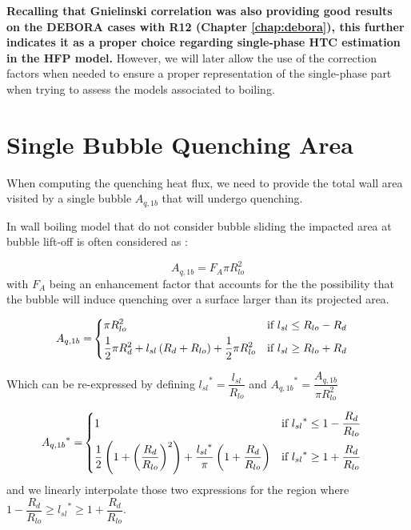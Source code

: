 \textbf{Recalling that Gnielinski correlation was also providing good results on the DEBORA cases with R12 (Chapter \ref{chap:debora}), this further indicates it as a proper choice regarding single-phase HTC estimation in the HFP model.} However, we will later allow the use of the correction factors when needed to ensure a proper representation of the single-phase part when trying to assess the models associated to boiling.




\section{Single Bubble Quenching Area}

When computing the quenching heat flux, we need to provide the total wall area visited by a single bubble $A_{q,1b}$ that will undergo quenching.

In wall boiling model that do not consider bubble sliding \cite{kurul_podowski, ncfd_hfp, shaver_podowski} the impacted area at bubble lift-off is often considered as :

\begin{equation}
A_{q,1b} = F_{A} \pi R_{lo}^{2}
\end{equation} 
with $F_{A}$ being an enhancement factor that accounts for the the possibility that the bubble will induce quenching over a surface larger than its projected area.



\begin{align}
A_{q,1b} = &
\begin{dcases}
\pi R_{lo}^{2} & \text{if } l_{sl}\leq R_{lo}-R_{d} \\
%
\frac{1}{2}\pi R_{d}^{2} + l_{sl}\parth{R_{d}+R_{lo}} + \frac{1}{2}\pi R_{lo}^{2} & \text{if } l_{sl} \geq R_{lo}+R_{d}
%
\end{dcases}
\end{align}

Which can be re-expressed by defining ${l_{sl}}^{*}=\dfrac{l_{sl}}{R_{lo}}$ and ${A_{q,1b}}^{*}=\dfrac{A_{q,1b}}{\pi R_{lo}^{2}}$

\begin{align}
{A_{q,1b}}^{*} = &
\begin{dcases}
1 & \text{if } {l_{sl}}^{*}\leq 1- \frac{R_{d}}{R_{lo}} \\
%
\frac{1}{2}\parth{1+\parth{\frac{R_{d}}{R_{lo}}}^{2} } + \frac{{l_{sl}}^{*}}{\pi}\parth{1+\frac{R_{d}}{R_{lo}}} & \text{if } {l_{sl}}^{*} \geq 1 + \frac{R_{d}}{R_{lo}}
\end{dcases}
\end{align}
and we linearly interpolate those two expressions for the region where $1-\dfrac{R_{d}}{R_{lo}}\geq {l_{sl}}^{*} \geq 1+\dfrac{R_{d}}{R_{lo}}$.


